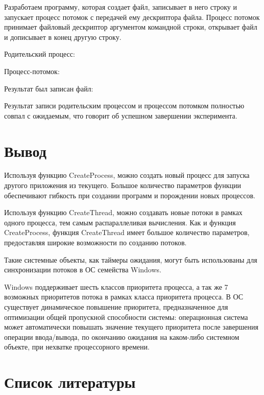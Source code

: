 \documentclass[14pt,a4paper,report]{report}
\begin{document}
Разработаем программу, которая создает файл, записывает в него строку и запускает процесс потомок с передачей ему дескриптора файла. Процесс потомок принимает файловый дескриптор аргументом командной строки, открывает файл и дописывает в конец другую строку.

Родительский процесс:

 

Процесс-потомок:

 

Результат был записан файл:

 

Результат записи родительским процессом и процессом потомком полностью совпал с ожидаемым, что говорит об успешном завершении эксперимента.

\section{Вывод}

Используя функцию CreateProcess, можно создать новый процесс для запуска другого приложения из текущего. Большое количество параметров функции обеспечивают гибкость при создании программ и порождении новых процессов.

Используя функцию CreateThread, можно создавать новые потоки в рамках одного процесса, тем самым распараллеливая вычисления. Как и функция CreateProcess, функция CreateThread имеет большое количество параметров, предоставляя широкие возможности по созданию потоков.

Такие системные объекты, как таймеры ожидания, могут быть использованы для синхронизации потоков в ОС семейства Windows.

Windows поддерживает шесть классов приоритета процесса, а так же 7 возможных приоритетов потока в рамках класса приоритета процесса. В ОС существует динамическое повышение приоритета, предназначенное для оптимизации общей пропускной способности системы: операционная система может автоматически повышать значение текущего приоритета после завершения операции ввода/вывода, по окончанию ожидания на каком-либо системном объекте, при нехватке процессорного времени.

\section{Список литературы}
\end{document}
